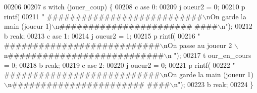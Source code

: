 \begin{DoxyCode}
00206 
00207                                                                                 \textcolor{keywordflow}{s
      witch} (jouer\_coup) \{
00208                                                                                 \textcolor{keywordflow}{c
      ase} 0:
00209                                                                                         j
      oueur2 = 0;
00210                                                                                         p
      rintf(
00211                                                                                                         \textcolor{stringliteral}{"
      ###########################\(\backslash\)nOn garde la main (joueur 1)\(\backslash\)n#######################
      ####\(\backslash\)n"});
00212                                                                                         \textcolor{keywordflow}{b
      reak};
00213                                                                                 \textcolor{keywordflow}{c
      ase} 1:
00214                                                                                         j
      oueur2 = 1;
00215                                                                                         p
      rintf(
00216                                                                                                         \textcolor{stringliteral}{"
      ###########################\(\backslash\)nOn passe au joueur 2 \(\backslash\)n###########################\(\backslash\)n
      "});
00217                                                                                         t
      our\_en\_cours = 0;
00218                                                                                         \textcolor{keywordflow}{b
      reak};
00219                                                                                 \textcolor{keywordflow}{c
      ase} 2:
00220                                                                                         j
      oueur2 = 0;
00221                                                                                         p
      rintf(
00222                                                                                                         \textcolor{stringliteral}{"
      ###########################\(\backslash\)nOn garde la main (joueur 1)\(\backslash\)n#######################
      ####\(\backslash\)n"});
00223                                                                                         \textcolor{keywordflow}{b
      reak};
00224                                                                                 \}
      

\end{DoxyCode}
